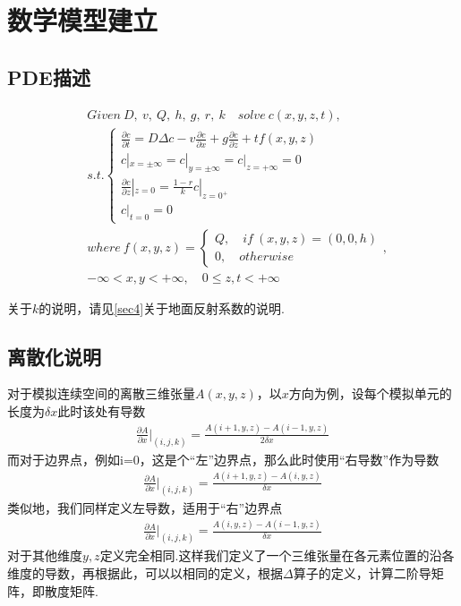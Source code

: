 \documentclass{article}
\begin{document}
	\section{数学模型建立}
	\subsection{PDE描述}\label{sec2}
	\begin{Large}
	\begin{align*}
		&Given ~ D, ~ v, ~ Q, ~h, ~g, ~r, ~k \quad solve ~ c(x,y,z,t),\\
		&s.t.
		\begin{cases}
			\frac{\partial c}{\partial t} = D\Delta c - v\frac{\partial c}{\partial x} + g\frac{\partial c}{\partial z} + tf(x,y,z)	\\
			c|_{x=\pm\infty}=c|_{y=\pm\infty}=c|_{z=+\infty}=0	\\
			\frac{\partial c}{\partial z}|_{z=0} = \frac{1-r}{k}c|_{z=0^+}	\\
			c|_{t=0}=0
		\end{cases}\\
		&where  ~
		f(x,y,z) = 
		\begin{cases}
			Q, \quad if~(x, y, z)=(0, 0, h)\\
			0, \quad otherwise
		\end{cases},\\
		&-\infty<x, y<+\infty, \quad 0\leq z, t<+\infty
	\end{align*}
	\end{Large}
	关于$k$的说明，请见\cref{sec4}关于地面反射系数的说明.

	\subsection{离散化说明}\label{sec3}
	对于模拟连续空间的离散三维张量$A(x, y, z)$，以$x$方向为例，设每个模拟单元的长度为$\delta x$此时该处有导数
	\begin{align*}
		\frac{\partial A}{\partial x}|_{(i, j, k)} = \frac{A(i+1, y, z)-A(i-1, y, z)}{2\delta x}
	\end{align*}
	而对于边界点，例如i=0，这是个“左”边界点，那么此时使用“右导数”作为导数
	\begin{align*}
		\frac{\partial A}{\partial x}|_{(i, j, k)} = \frac{A(i+1, y, z)-A(i, y, z)}{\delta x}
	\end{align*}
	类似地，我们同样定义左导数，适用于“右”边界点
	\begin{align*}
		\frac{\partial A}{\partial x}|_{(i, j, k)} = \frac{A(i, y, z)-A(i-1, y, z)}{\delta x}
	\end{align*}
	对于其他维度$y,z$定义完全相同.这样我们定义了一个三维张量在各元素位置的沿各维度的导数，再根据此，可以以相同的定义，根据$\Delta$算子的定义，计算二阶导矩阵，即散度矩阵.
	
\end{document}
